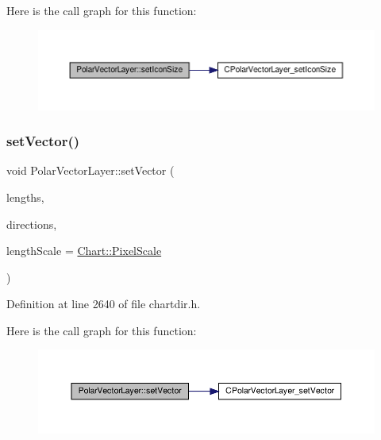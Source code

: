 Here is the call graph for this function\+:
\nopagebreak
\begin{figure}[H]
\begin{center}
\leavevmode
\includegraphics[width=350pt]{class_polar_vector_layer_a37700e57ce3ce0b6deda4782112b56c9_cgraph}
\end{center}
\end{figure}
\mbox{\label{class_polar_vector_layer_a519151c26677acbcde525cac0964f5b3}} 
\subsubsection{\texorpdfstring{set\+Vector()}{setVector()}}
{\footnotesize\ttfamily void Polar\+Vector\+Layer\+::set\+Vector (\begin{DoxyParamCaption}\item[{\hyperlink{class_double_array}{Double\+Array}}]{lengths,  }\item[{\hyperlink{class_double_array}{Double\+Array}}]{directions,  }\item[{int}]{length\+Scale = {\ttfamily \hyperlink{namespace_chart_af8005281e1fb57d737e9f89b13605808afebebf69a28e58958dc5f9da3ece2147}{Chart\+::\+Pixel\+Scale}} }\end{DoxyParamCaption})\hspace{0.3cm}{\ttfamily [inline]}}



Definition at line 2640 of file chartdir.\+h.

Here is the call graph for this function\+:
\nopagebreak
\begin{figure}[H]
\begin{center}
\leavevmode
\includegraphics[width=350pt]{class_polar_vector_layer_a519151c26677acbcde525cac0964f5b3_cgraph}
\end{center}
\end{figure}
\mbox{\label{class_polar_vector_layer_af632962b27285ff43ce920aecf6111f5}} 
